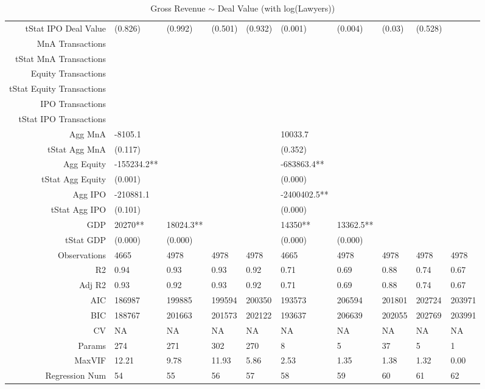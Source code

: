 \begin{table}[ht]
\begin{tabular}{rlllllllll}
  tStat IPO Deal Value & (0.826) & (0.992) & (0.501) & (0.932) & (0.001) & (0.004) & (0.03) & (0.528) &  \\ 
  MnA Transactions &  &  &  &  &  &  &  &  &  \\ 
  tStat MnA Transactions &  &  &  &  &  &  &  &  &  \\ 
  Equity Transactions &  &  &  &  &  &  &  &  &  \\ 
  tStat Equity Transactions &  &  &  &  &  &  &  &  &  \\ 
  IPO Transactions &  &  &  &  &  &  &  &  &  \\ 
  tStat IPO Transactions &  &  &  &  &  &  &  &  &  \\ 
  Agg MnA & -8105.1 &  &  &  & 10033.7 &  &  &  &  \\ 
  tStat Agg MnA & (0.117) &  &  &  & (0.352) &  &  &  &  \\ 
  Agg Equity & -155234.2** &  &  &  & -683863.4** &  &  &  &  \\ 
  tStat Agg Equity & (0.001) &  &  &  & (0.000) &  &  &  &  \\ 
  Agg IPO & -210881.1 &  &  &  & -2400402.5** &  &  &  &  \\ 
  tStat Agg IPO & (0.101) &  &  &  & (0.000) &  &  &  &  \\ 
  GDP & 20270** & 18024.3** &  &  & 14350** & 13362.5** &  &  &  \\ 
  tStat GDP & (0.000) & (0.000) &  &  & (0.000) & (0.000) &  &  &  \\ 
  Observations & 4665 & 4978 & 4978 & 4978 & 4665 & 4978 & 4978 & 4978 & 4978 \\ 
  R2 & 0.94 & 0.93 & 0.93 & 0.92 & 0.71 & 0.69 & 0.88 & 0.74 & 0.67 \\ 
  Adj R2 & 0.93 & 0.92 & 0.93 & 0.92 & 0.71 & 0.69 & 0.88 & 0.74 & 0.67 \\ 
  AIC & 186987 & 199885 & 199594 & 200350 & 193573 & 206594 & 201801 & 202724 & 203971 \\ 
  BIC & 188767 & 201663 & 201573 & 202122 & 193637 & 206639 & 202055 & 202769 & 203991 \\ 
  CV & NA & NA & NA & NA & NA & NA & NA & NA & NA \\ 
  Params & 274 & 271 & 302 & 270 & 8 & 5 & 37 & 5 & 1 \\ 
  MaxVIF & 12.21 & 9.78 & 11.93 & 5.86 & 2.53 & 1.35 & 1.38 & 1.32 & 0.00 \\ 
  Regression Num & 54 & 55 & 56 & 57 & 58 & 59 & 60 & 61 & 62 \\ 
   \hline
\end{tabular}
\caption{Gross Revenue $\sim$ Deal Value (with log(Lawyers))} 
\end{table}
